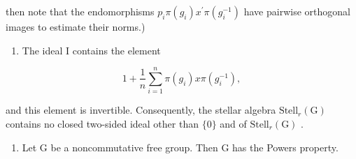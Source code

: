 then note that the endomorphisms \(p_{i}\pi(g_{i})x^{\prime}\pi(g_{i}^{-1})\) have pairwise orthogonal images to estimate their norms.)

\begin{enumerate}
\def\labelenumi{\alph{enumi})}
\setcounter{enumi}{3}
\tightlist
\item
  The ideal I contains the element
\end{enumerate}

\[
1 + \frac {1}{n} \sum_ {i = 1} ^ {n} \pi (g _ {i}) x \pi (g _ {i} ^ {- 1}),
\]

and this element is invertible. Consequently, the stellar algebra \(\text{Stell}_{r}(\text{G})\) contains no closed two-sided ideal other than \(\{0\}\) and of \(\text{Stell}_{r}(\text{G})\) .

\begin{enumerate}
\def\labelenumi{\alph{enumi})}
\setcounter{enumi}{4}
\tightlist
\item
  Let G be a noncommutative free group. Then G has the Powers property.
\end{enumerate}
